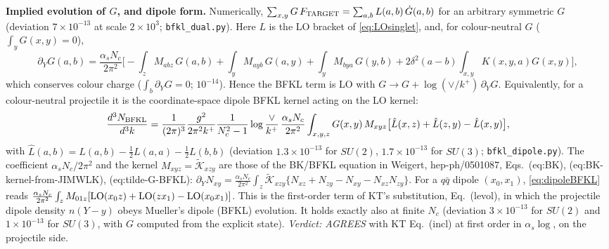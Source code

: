 \medskip\noindent\textbf{Implied evolution of $G$, and dipole form.} Numerically, $\sum_{x,y}G\,F_{\rm TARGET}=\sum_{a,b}L(a,b)\,\dot G(a,b)$ for an arbitrary symmetric $G$ (deviation $7\times10^{-13}$ at scale $2\times10^3$; \texttt{bfkl\_dual.py}). Here $L$ is the LO bracket of \eqref{eq:LOsinglet}, and, for colour-neutral $G$ ($\int_yG(x,y)=0$),
\begin{equation}
\partial_YG(a,b)=\frac{\alpha_sN_c}{2\pi^2}\Big[-\!\int_zM_{abz}\,G(a,b)+\!\int_yM_{ayb}\,G(a,y)+\!\int_yM_{bya}\,G(y,b)+2\delta^2(a-b)\!\int_{x,y}\!K(x,y,a)G(x,y)\Big],
\label{eq:Gdot}
\end{equation}
which conserves colour charge ($\int_b\partial_YG=0$; $10^{-14}$). Hence the BFKL term is LO with $G\to G+\log(\vee/k^+)\,\partial_YG$. Equivalently, for a colour-neutral projectile it is the coordinate-space dipole BFKL kernel acting on the LO kernel:
\begin{equation}
\frac{d^3N_{\rm BFKL}}{d^3k}=\frac{1}{(2\pi)^3}\frac{g^2}{2\pi^2k^+}\frac{1}{N_c^2-1}\log\frac{\vee}{k^+}\,\frac{\alpha_sN_c}{2\pi^2}\int_{x,y,z}G(x,y)\,M_{xyz}\big[\hat L(x,z)+\hat L(z,y)-\hat L(x,y)\big],
\label{eq:dipoleBFKL}
\end{equation}
with $\hat L(a,b)=L(a,b)-\tfrac12L(a,a)-\tfrac12L(b,b)$
(deviation $1.3\times10^{-13}$ for $SU(2)$, $1.7\times10^{-13}$ for $SU(3)$; \texttt{bfkl\_dipole.py}). The coefficient $\alpha_sN_c/2\pi^2$ and the kernel $M_{xyz}=\tilde{\mathcal K}_{xzy}$ are those of the BK/BFKL equation in Weigert, hep-ph/0501087, Eqs.~(eq:BK), (eq:BK-kernel-from-JIMWLK), (eq:tilde-G-BFKL): $\partial_YN_{xy}=\frac{\alpha_sN_c}{2\pi^2}\int_z\tilde{\mathcal K}_{xzy}\{N_{xz}+N_{zy}-N_{xy}-N_{xz}N_{zy}\}$.
For a $q\bar q$ dipole $(x_0,x_1)$, \eqref{eq:dipoleBFKL} reads $\frac{\alpha_sN_c}{2\pi^2}\int_zM_{01z}[{\rm LO}(x_0z)+{\rm LO}(zx_1)-{\rm LO}(x_0x_1)]$. This is the first-order term of KT's substitution, Eq.~(levol), in which the projectile dipole density $n(Y-y)$ obeys Mueller's dipole (BFKL) evolution. It holds exactly also at finite $N_c$ (deviation $3\times10^{-13}$ for $SU(2)$ and $1\times10^{-13}$ for $SU(3)$, with $G$ computed from the explicit state). \emph{Verdict: AGREES} with KT Eq.~(incl) at first order in $\alpha_s\log$, on the projectile side.

